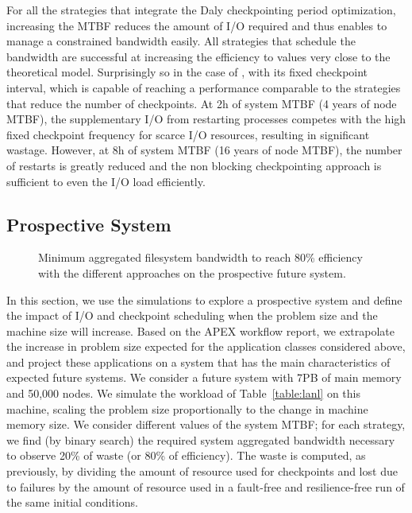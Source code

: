 For all the strategies that integrate the Daly checkpointing period
optimization, increasing the MTBF reduces the amount of I/O required
and thus enables to manage a constrained bandwidth easily. All
strategies that schedule the bandwidth are successful at increasing the
efficiency to values very close to the theoretical model.
%
Surprisingly so in the case of \fifofixed, with its fixed checkpoint
interval, which is capable of reaching a performance
comparable to the strategies that reduce the number of
checkpoints. At 2h of system MTBF (4 years of node MTBF), the
supplementary I/O from restarting processes competes with the high
fixed checkpoint frequency for scarce I/O resources, resulting in
significant wastage. However, at 8h of system MTBF (16 years of node
MTBF), the number of restarts is greatly reduced and the non blocking
checkpointing approach is sufficient to even the I/O load efficiently.

\subsection{Prospective System}

\begin{figure}
  \begin{center}
    \resizebox{\linewidth}{!}{}
  \end{center}
  \caption{Minimum aggregated filesystem bandwidth to reach 80\%
    efficiency with the different approaches on the prospective
    future system.\label{fig:prosp}}
\end{figure}

In this section, we use the simulations to explore a prospective
system and define the impact of I/O and checkpoint scheduling when the
problem size and the machine size will increase. Based on the APEX
workflow report, we extrapolate the increase in problem size expected
for the application classes considered above, and project these
applications on a system that has the main characteristics of expected
future systems. We consider a future system with 7PB of main memory
and 50,000 nodes. We simulate the workload of Table~\ref{table:lanl}
on this machine, scaling the problem size proportionally to the
change in machine memory size. We consider different values of the
system MTBF; for each strategy, we find (by binary search) the
required system aggregated bandwidth necessary to observe 20\% of
waste (or 80\% of efficiency). The waste is computed, as previously,
by dividing the amount of resource used for checkpoints and lost due
to failures by the amount of resource used in a fault-free and
resilience-free run of the same initial conditions.

